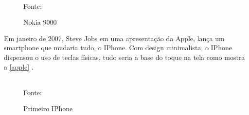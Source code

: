\begin{figure}[!htpb]
	\centering
	\caption{Nokia 9000}
	\\
	Fonte: \cite{nokia_9000}
	\label{nokia9}
\end{figure}

\newpage
Em janeiro de 2007, Steve Jobs em uma apresentação da Apple, lança um smartphone que mudaria tudo, o IPhone. Com design minimalista, o IPhone dispensou o uso de teclas físicas, tudo seria a base do toque na tela como mostra a \autoref{apple} \cite{historia_mobile2}.

\begin{figure}[!htpb]
	\centering
	\caption{Primeiro IPhone}
	\\
	Fonte: \cite{historia_mobile}
	\label{apple}
\end{figure}

